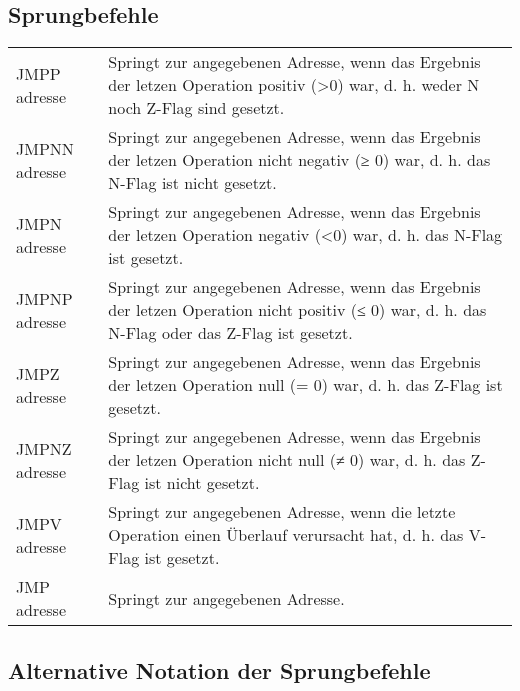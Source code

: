 \documentclass{lehramt-informatik-haupt}
\begin{document}
\subsection{Sprungbefehle}

\begin{tabularx}{\linewidth}{lX}
JMPP adresse  & Springt zur angegebenen Adresse, wenn das  Ergebnis der letzen Operation positiv (\textgreater 0) war, d. h. weder N noch  Z-Flag sind gesetzt. \\
JMPNN adresse & Springt zur angegebenen Adresse, wenn das  Ergebnis der letzen Operation nicht negativ (≥ 0) war, d. h. das N-Flag  ist nicht gesetzt. \\
JMPN adresse  & Springt zur angegebenen Adresse, wenn das Ergebnis der letzen Operation negativ (\textless 0) war, d. h. das N-Flag ist gesetzt. \\
JMPNP adresse & Springt zur angegebenen Adresse, wenn das  Ergebnis der letzen Operation nicht positiv (≤ 0) war, d. h. das N-Flag   oder das Z-Flag ist gesetzt. \\
JMPZ adresse  & Springt zur angegebenen Adresse, wenn das Ergebnis der letzen Operation null (= 0) war, d. h. das Z-Flag ist gesetzt. \\
JMPNZ adresse & Springt zur angegebenen Adresse, wenn das  Ergebnis der letzen Operation nicht null (≠ 0) war, d. h. das Z-Flag ist  nicht gesetzt. \\
JMPV adresse  & Springt zur angegebenen Adresse, wenn die letzte Operation einen Überlauf verursacht hat, d. h. das V-Flag ist gesetzt. \\
JMP adresse   & Springt zur angegebenen Adresse. \\

\end{tabularx}

\subsection{Alternative Notation der Sprungbefehle}
\end{document}
